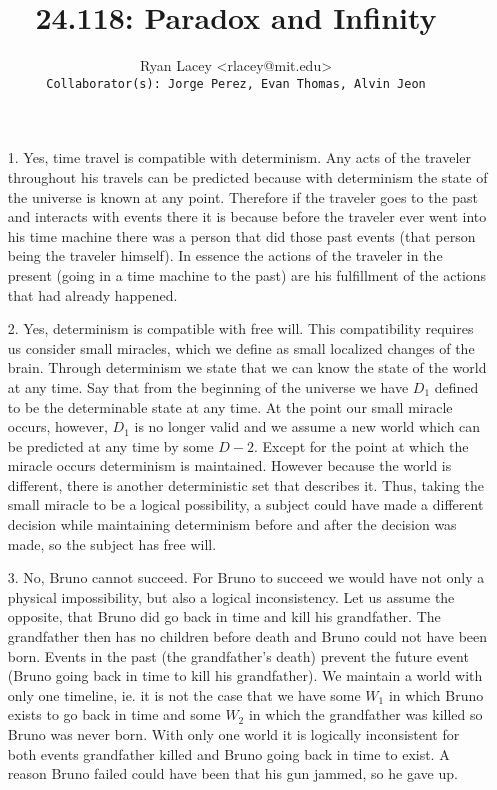 \documentclass{article}
\begin{document}

\title{24.118: Paradox and Infinity}
\author{
  Ryan Lacey <rlacey@mit.edu>\\
  \footnotesize \texttt{Collaborator(s): Jorge Perez, Evan Thomas, Alvin Jeon}
}
        
\maketitle
        


\begin{enumerate}
\item[1.]
	Yes, time travel is compatible with determinism. Any acts of the traveler throughout his travels can be predicted because with determinism the state of the universe is known at any point. Therefore if the traveler goes to the past and interacts with events there it is because before the traveler ever went into his time machine there was a person that did those past events (that person being the traveler himself). In essence the actions of the traveler in the present (going in a time machine to the past) are his fulfillment of the actions that had already happened. 

\bigskip

\item[2.]
	Yes, determinism is compatible with free will. This compatibility requires us consider small miracles, which we define as small localized changes of the brain. Through determinism we state that we can know the state of the world at any time. Say that from the beginning of the universe we have $D_1$ defined to be the determinable state at any time. At the point our small miracle occurs, however, $D_1$ is no longer valid and we assume a new world which can be predicted at any time by some $D-2$. Except for the point at which the miracle occurs determinism is maintained. However because the world is different, there is another deterministic set that describes it. Thus, taking the small miracle to be a logical possibility, a subject could have made a different decision while maintaining determinism before and after the decision was made, so the subject has free will.

\bigskip

\item[3.]
	No, Bruno cannot succeed. For Bruno to succeed we would have not only a physical impossibility, but also a logical inconsistency. Let us assume the opposite, that Bruno did go back in time and kill his grandfather. The grandfather then has no children before death and Bruno could not have been born. Events in the past (the grandfather's death) prevent the future event (Bruno going back in time to kill his grandfather). We maintain a world with only one timeline, ie. it is not the case that we have some $W_1$ in which Bruno exists to go back in time and some $W_2$ in which the grandfather was killed so Bruno was never born. With only one world it is logically inconsistent for both events grandfather killed and Bruno going back in time to exist. A reason Bruno failed could have been that his gun jammed, so he gave up.


\end{enumerate}
\end{document}
